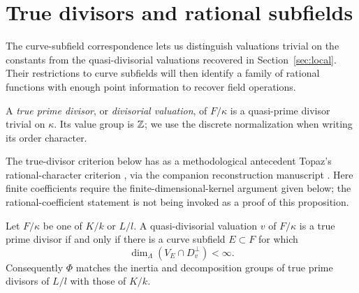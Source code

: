 \section{True divisors and rational subfields}
\label{sec:good-functions}

The curve-subfield correspondence lets us distinguish valuations trivial
on the constants from the quasi-divisorial valuations recovered in
Section~\ref{sec:local}.  Their restrictions to curve subfields will then
identify a family of rational functions with enough point information to
recover field operations.

A \emph{true prime divisor}, or \emph{divisorial valuation}, of $F/\kappa$
is a quasi-prime divisor trivial on $\kappa$.  Its value group is $\mathbb Z$;
we use the discrete normalization when writing its order character.

The true-divisor criterion below has as a methodological antecedent
Topaz's rational-character criterion \cite[Lemma~A.7]{Topaz2021Torelli},
via the companion reconstruction manuscript \cite[Sections~4--6]{InternalBP}.
Here finite coefficients require the finite-dimensional-kernel argument
given below; the rational-coefficient statement is not being invoked as
a proof of this proposition.

\begin{proposition}
\label{prop:true-divisors}
Let $F/\kappa$ be one of $K/k$ or $L/l$.  A quasi-divisorial valuation
$v$ of $F/\kappa$ is a true prime divisor if and only if there is a curve
subfield $E\subset F$ for which
\begin{equation}
\label{eq:good-true-test}
                         \dim_\Lambda(V_E\cap D_v^\perp)<\infty.
\end{equation}
Consequently $\Phi$ matches the inertia and decomposition groups of true
prime divisors of $L/l$ with those of $K/k$.
\end{proposition}

